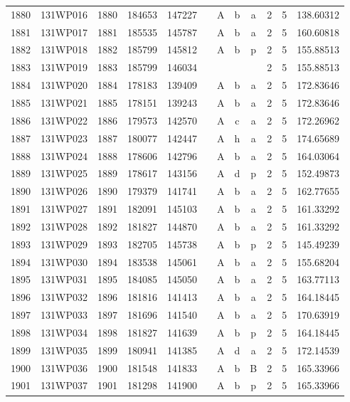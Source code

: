 \begin{tabular}{|*{12}{c|}}
1880 & 131WP016 & 1880 & 184653 & 147227 &  & A & b & a & 2 & 5 & 138.60312 \\ 
1881 & 131WP017 & 1881 & 185535 & 145787 &  & A & b & a & 2 & 5 & 160.60818 \\ 
1882 & 131WP018 & 1882 & 185799 & 145812 &  & A & b & p & 2 & 5 & 155.88513 \\ 
1883 & 131WP019 & 1883 & 185799 & 146034 &  &  &  &  & 2 & 5 & 155.88513 \\ 
1884 & 131WP020 & 1884 & 178183 & 139409 &  & A & b & a & 2 & 5 & 172.83646 \\ 
1885 & 131WP021 & 1885 & 178151 & 139243 &  & A & b & a & 2 & 5 & 172.83646 \\ 
1886 & 131WP022 & 1886 & 179573 & 142570 &  & A & c & a & 2 & 5 & 172.26962 \\ 
1887 & 131WP023 & 1887 & 180077 & 142447 &  & A & h & a & 2 & 5 & 174.65689 \\ 
1888 & 131WP024 & 1888 & 178606 & 142796 &  & A & b & a & 2 & 5 & 164.03064 \\ 
1889 & 131WP025 & 1889 & 178617 & 143156 &  & A & d & p & 2 & 5 & 152.49873 \\ 
1890 & 131WP026 & 1890 & 179379 & 141741 &  & A & b & a & 2 & 5 & 162.77655 \\ 
1891 & 131WP027 & 1891 & 182091 & 145103 &  & A & b & a & 2 & 5 & 161.33292 \\ 
1892 & 131WP028 & 1892 & 181827 & 144870 &  & A & b & a & 2 & 5 & 161.33292 \\ 
1893 & 131WP029 & 1893 & 182705 & 145738 &  & A & b & p & 2 & 5 & 145.49239 \\ 
1894 & 131WP030 & 1894 & 183538 & 145061 &  & A & b & a & 2 & 5 & 155.68204 \\ 
1895 & 131WP031 & 1895 & 184085 & 145050 &  & A & b & a & 2 & 5 & 163.77113 \\ 
1896 & 131WP032 & 1896 & 181816 & 141413 &  & A & b & a & 2 & 5 & 164.18445 \\ 
1897 & 131WP033 & 1897 & 181696 & 141540 &  & A & b & a & 2 & 5 & 170.63919 \\ 
1898 & 131WP034 & 1898 & 181827 & 141639 &  & A & b & p & 2 & 5 & 164.18445 \\ 
1899 & 131WP035 & 1899 & 180941 & 141385 &  & A & d & a & 2 & 5 & 172.14539 \\ 
1900 & 131WP036 & 1900 & 181548 & 141833 &  & A & b & B & 2 & 5 & 165.33966 \\ 
1901 & 131WP037 & 1901 & 181298 & 141900 &  & A & b & p & 2 & 5 & 165.33966 \\ 

\end{tabular}
